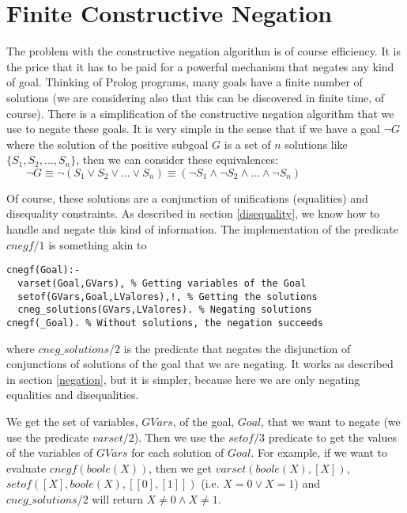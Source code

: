 \documentclass{tlp}
\begin{document}
 


\section{Finite Constructive Negation}
\label{cnegf}

The problem with the constructive negation algorithm is of course
efficiency. It is the price that it has to be paid for a powerful
mechanism that negates any kind of goal. Thinking of Prolog programs,
many goals have a finite number of solutions (we are considering also
that this can be discovered in finite time, of course). There is a
simplification of the constructive negation algorithm that we use to
negate these goals. It is very simple in the sense that if we have a
goal $\neg G$ where the solution of the positive subgoal $G$ is a set
of $n$ solutions like $\{S_1, S_2,...,S_n\}$, then we can consider
these equivalences: %
$~~~~~~~~\neg G \equiv \neg(S_1 \vee S_2 \vee ... \vee S_n) 
 \equiv (\neg S_1 \wedge \neg S_2 \wedge ... \wedge \neg S_n)$

Of course, these solutions are a conjunction of unifications
(equalities) and disequality constraints. As described in section
\ref{disequality}, we know how to handle and negate this kind of
information. The implementation of the predicate $cnegf/1$ is
something akin to

{\small
\begin{verbatim}
cnegf(Goal):-
  varset(Goal,GVars), % Getting variables of the Goal
  setof(GVars,Goal,LValores),!, % Getting the solutions
  cneg_solutions(GVars,LValores). % Negating solutions
cnegf(_Goal). % Without solutions, the negation succeeds
\end{verbatim}
}
\noindent
where $cneg\_solutions/2$ is the predicate that negates the disjunction
of conjunctions of solutions of the goal that we are negating. It
works as described in section \ref{negation}, but it is simpler,
because here we are only negating equalities and disequalities.

We get the set of variables, $GVars$, of the goal, $Goal$, that we
want to negate (we use the predicate $varset/2$). Then we use the
$setof/3$ predicate to get the values of the variables of $GVars$
 for each solution of $Goal$. For example, if we want to
evaluate $cnegf(boole(X))$, then we get $varset(boole(X),[X])$,
$setof([X],boole(X),[[0],[1]])$ (i.e. $X=0 \vee X=1$) and
$cneg\_solutions/2$ will return $X \neq 0
\wedge X \neq 1$. 
\end{document}
